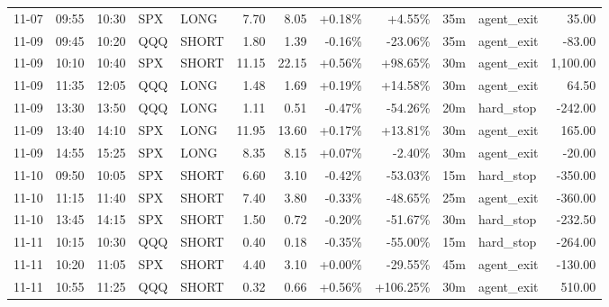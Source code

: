 \documentclass[11pt,a4paper,twoside]{article}
\begin{document}
\begin{center}
\begin{longtable}{>{\color{txtmain}}l l l l l r r r r r >{\color{txtmain}}l r}
11-07 & 09:55 & 10:30 & SPX & LONG & 7.70 & 8.05 & \textcolor{wingreen}{+0.18\%} & \textcolor{wingreen}{+4.55\%} & 35m & agent\_exit & \textcolor{wingreen}{35.00} \\
11-09 & 09:45 & 10:20 & QQQ & SHORT & 1.80 & 1.39 & \textcolor{lossred}{-0.16\%} & \textcolor{lossred}{-23.06\%} & 35m & agent\_exit & \textcolor{lossred}{-83.00} \\
11-09 & 10:10 & 10:40 & SPX & SHORT & 11.15 & 22.15 & \textcolor{wingreen}{+0.56\%} & \textcolor{wingreen}{+98.65\%} & 30m & agent\_exit & \textcolor{wingreen}{1,100.00} \\
11-09 & 11:35 & 12:05 & QQQ & LONG & 1.48 & 1.69 & \textcolor{wingreen}{+0.19\%} & \textcolor{wingreen}{+14.58\%} & 30m & agent\_exit & \textcolor{wingreen}{64.50} \\
11-09 & 13:30 & 13:50 & QQQ & LONG & 1.11 & 0.51 & \textcolor{lossred}{-0.47\%} & \textcolor{lossred}{-54.26\%} & 20m & hard\_stop & \textcolor{lossred}{-242.00} \\
11-09 & 13:40 & 14:10 & SPX & LONG & 11.95 & 13.60 & \textcolor{wingreen}{+0.17\%} & \textcolor{wingreen}{+13.81\%} & 30m & agent\_exit & \textcolor{wingreen}{165.00} \\
11-09 & 14:55 & 15:25 & SPX & LONG & 8.35 & 8.15 & \textcolor{wingreen}{+0.07\%} & \textcolor{lossred}{-2.40\%} & 30m & agent\_exit & \textcolor{lossred}{-20.00} \\
11-10 & 09:50 & 10:05 & SPX & SHORT & 6.60 & 3.10 & \textcolor{lossred}{-0.42\%} & \textcolor{lossred}{-53.03\%} & 15m & hard\_stop & \textcolor{lossred}{-350.00} \\
11-10 & 11:15 & 11:40 & SPX & SHORT & 7.40 & 3.80 & \textcolor{lossred}{-0.33\%} & \textcolor{lossred}{-48.65\%} & 25m & agent\_exit & \textcolor{lossred}{-360.00} \\
11-10 & 13:45 & 14:15 & SPX & SHORT & 1.50 & 0.72 & \textcolor{lossred}{-0.20\%} & \textcolor{lossred}{-51.67\%} & 30m & hard\_stop & \textcolor{lossred}{-232.50} \\
11-11 & 10:15 & 10:30 & QQQ & SHORT & 0.40 & 0.18 & \textcolor{lossred}{-0.35\%} & \textcolor{lossred}{-55.00\%} & 15m & hard\_stop & \textcolor{lossred}{-264.00} \\
11-11 & 10:20 & 11:05 & SPX & SHORT & 4.40 & 3.10 & \textcolor{wingreen}{+0.00\%} & \textcolor{lossred}{-29.55\%} & 45m & agent\_exit & \textcolor{lossred}{-130.00} \\
11-11 & 10:55 & 11:25 & QQQ & SHORT & 0.32 & 0.66 & \textcolor{wingreen}{+0.56\%} & \textcolor{wingreen}{+106.25\%} & 30m & agent\_exit & \textcolor{wingreen}{510.00} \\

\end{longtable}
\end{center}
\end{document}
